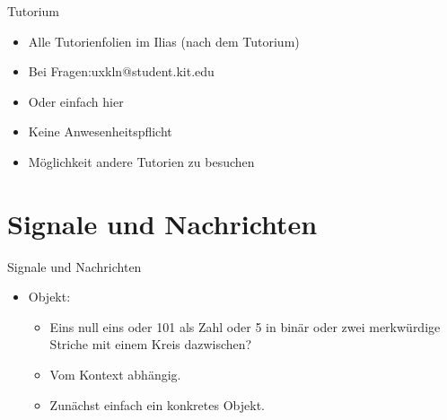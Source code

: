 \documentclass{beamer}
\begin{document}
\begin{frame}{Tutorium}
	\begin{itemize}
		\item Alle Tutorienfolien im Ilias (nach dem Tutorium)
	\end{itemize}
	 
	
	\begin{itemize}
		\item Bei Fragen:uxkln@student.kit.edu 
		\item Oder einfach hier
		\item Keine Anwesenheitspflicht 
		\item Möglichkeit andere Tutorien zu besuchen
	\end{itemize}
\end{frame}


\section{Signale und Nachrichten}

\begin{frame}{Signale und Nachrichten}
	\begin{itemize}
		 \item Objekt: 
		\begin{itemize}
			 \item Eins null eins oder 101 als Zahl oder 5 in binär oder zwei merkwürdige Striche mit einem Kreis dazwischen?
			 \item Vom Kontext abhängig.
			 \item Zunächst einfach ein konkretes Objekt.
		\end{itemize}
	\end{itemize}
\end{frame}
\end{document}
